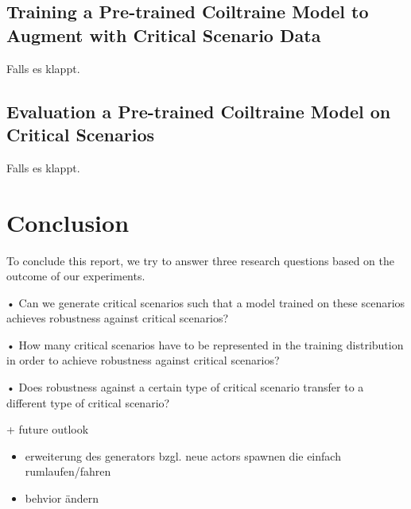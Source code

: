 \documentclass[conference, 11pt]{IEEEtran}
\begin{document}
\subsection{Training a Pre-trained Coiltraine Model to Augment with Critical Scenario Data}
Falls es klappt.

\subsection{Evaluation a Pre-trained Coiltraine Model on Critical Scenarios}
Falls es klappt.



\section{Conclusion}
To conclude this report, we try to answer three research questions based on the outcome of our experiments.

• Can we generate critical scenarios such that a model trained
on these scenarios achieves robustness against critical
scenarios?

• How many critical scenarios have to be represented in the
training distribution in order to achieve robustness against
critical scenarios?

• Does robustness against a certain type of critical scenario
transfer to a different type of critical scenario?

+ future outlook

\begin{itemize}
	\item erweiterung des generators bzgl. neue actors spawnen die einfach rumlaufen/fahren
	\item behvior ändern
\end{itemize}

\printbibliography
\end{document}
